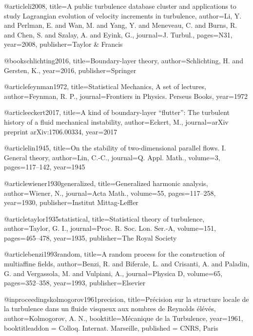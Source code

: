 @article{li2008,
  title={{A public turbulence database cluster and applications to study Lagrangian evolution of velocity increments in turbulence}},
  author={Li, Y. and Perlman, E. and Wan, M. and Yang, Y. and Meneveau, C. and Burns, R. and Chen, S. and Szalay, A. and Eyink, G.},
  journal={J. Turbul.},
  pages={N31},
  year={2008},
  publisher={Taylor \& Francis}
}


@book{schlichting2016,
  title={{Boundary-layer theory}},
  author={Schlichting, H. and Gersten, K.},
  year={2016},
  publisher={Springer}
}


@article{feynman1972,
  title={{Statistical Mechanics, A set of lectures}},
  author={Feynman, R. P.},
  journal={Frontiers in Physics. Perseus Books},
  year={1972}
}


  @article{eckert2017,
    title={{A kind of boundary-layer \enquote{flutter}: The turbulent history of a fluid mechanical instability}},
    author={Eckert, M.},
    journal={arXiv preprint arXiv:1706.00334},
    year={2017}
  }

  @article{lin1945,
    title={{On the stability of two-dimensional parallel flows. I. General theory}},
    author={Lin, C.-C.},
    journal={Q. Appl. Math.},
    volume={3},
    pages={117--142},
    year={1945}
  }

  @article{wiener1930generalized,
    title={{Generalized harmonic analysis}},
    author={Wiener, N.},
    journal={Acta Math.},
    volume={55},
    pages={117--258},
    year={1930},
    publisher={Institut Mittag-Leffler}
  }

  @article{taylor1935statistical,
    title={{Statistical theory of turbulence}},
    author={Taylor, G. I.},
    journal={Proc. R. Soc. Lon. Ser.-A},
    volume={151},
    pages={465--478},
    year={1935},
    publisher={The Royal Society}
  }

@article{benzi1993random,
  title={{A random process for the construction of multiaffine fields}},
  author={Benzi, R. and Biferale, L. and Crisanti, A. and Paladin, G. and Vergassola, M. and Vulpiani, A.},
  journal={Physica D},
  volume={65},
  pages={352--358},
  year={1993},
  publisher={Elsevier}
}

@inproceedings{kolmogorov1961precision,
    title={{Pr{\'e}cision sur la structure locale de la turbulence dans un fluide visqueux aux nombres de Reynolds {\'e}l{\'e}v{\'e}s}},
    author={Kolmogorov, A. N.},
    booktitle={M{\'e}canique de la Turbulence},
    year={1961},
    booktitleaddon = {Colloq. Internat. Marseille},
    published = {CNRS, Paris}
  }

